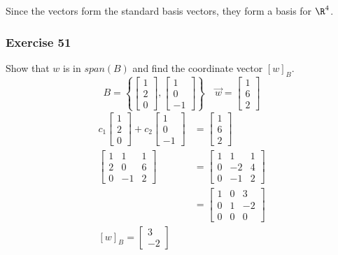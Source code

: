 \documentclass{math}
\begin{document}
Since the vectors form the standard basis vectors, they form a basis for
\( \R^4 \).

\subsubsection*{Exercise 51}
Show that \( w \) is in \( span(B) \) and find the coordinate vector
\( [w]_B \).
\[ B = \left\{\begin{bmatrix}1 \\ 2 \\ 0\end{bmatrix},
  \begin{bmatrix}1 \\ 0 \\ -1\end{bmatrix}\right\} \quad
  \vec{w} = \begin{bmatrix}1 \\ 6 \\ 2\end{bmatrix} \]
\begin{align*}
  c_1\begin{bmatrix}1 \\ 2 \\ 0\end{bmatrix}+
    c_2\begin{bmatrix}1 \\ 0 \\ -1\end{bmatrix} &=
    \begin{bmatrix}1 \\ 6 \\ 2\end{bmatrix} \\
  \begin{bmatrix}
    1 & 1 & 1 \\
    2 & 0 & 6 \\
    0 & -1 & 2
  \end{bmatrix} &= \begin{bmatrix}
    1 & 1 & 1 \\
    0 & -2 & 4 \\
    0 & -1 & 2
  \end{bmatrix} \\
  &= \begin{bmatrix}
    1 & 0 & 3 \\
    0 & 1 & -2 \\
    0 & 0 & 0
  \end{bmatrix} \\
  [w]_B = \begin{bmatrix}3 \\ -2\end{bmatrix}
\end{align*}
\end{document}
